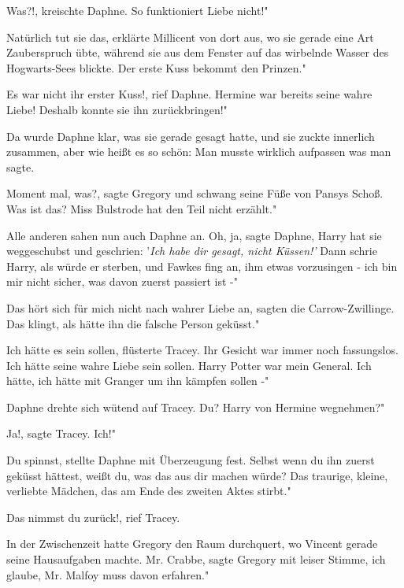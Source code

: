 \glqq{}Was?!\grqq{}, kreischte Daphne. \glqq{}So funktioniert Liebe nicht!"

\glqq{}Natürlich tut sie das\grqq{}, erklärte Millicent von dort aus, wo sie
gerade eine Art Zauberspruch übte, während sie aus dem Fenster auf das wirbelnde
Wasser des Hogwarts-Sees blickte. \glqq{}Der erste Kuss bekommt den Prinzen."

\glqq{}Es war nicht ihr erster Kuss!\grqq{}, rief Daphne. \glqq{}Hermine war
bereits seine wahre Liebe! Deshalb konnte sie ihn zurückbringen!"

Da wurde Daphne klar, was sie gerade gesagt hatte, und sie zuckte innerlich
zusammen, aber wie heißt es so schön: Man musste wirklich aufpassen was man
sagte.

\glqq{}Moment mal, was?\grqq{}, sagte Gregory und schwang seine Füße von Pansys
Schoß. \glqq{}Was ist das? Miss Bulstrode hat den Teil nicht erzählt."

Alle anderen sahen nun auch Daphne an. \glqq{}Oh, ja\grqq{}, sagte Daphne, \glqq{}
Harry hat sie weggeschubst und geschrien: '\emph{Ich habe dir gesagt, nicht
Küssen!'} Dann schrie Harry, als würde er sterben, und Fawkes fing an, ihm etwas
vorzusingen - ich bin mir nicht sicher, was davon zuerst passiert ist -"

\glqq{}Das hört sich für mich nicht nach wahrer Liebe an\grqq{}, sagten die
Carrow-Zwillinge. \glqq{}Das klingt, als hätte ihn die falsche Person geküsst."

\glqq{}Ich hätte es sein sollen\grqq{}, flüsterte Tracey. Ihr Gesicht war immer
noch fassungslos. \glqq{}Ich hätte seine wahre Liebe sein sollen. Harry Potter
war mein General. Ich hätte, ich hätte mit Granger um ihn kämpfen sollen -"

Daphne drehte sich wütend auf Tracey. \glqq{}Du? Harry von Hermine wegnehmen?"

\glqq{}Ja!\grqq{}, sagte Tracey. \glqq{}Ich!"

\glqq{}Du spinnst\grqq{}, stellte Daphne mit Überzeugung fest. \glqq{}Selbst wenn
du ihn zuerst geküsst hättest, weißt du, was das aus dir machen würde? Das
traurige, kleine, verliebte Mädchen, das am Ende des zweiten Aktes stirbt."

\glqq{}Das nimmst du zurück!\grqq{}, rief Tracey.

In der Zwischenzeit hatte Gregory den Raum durchquert, wo Vincent gerade seine
Hausaufgaben machte. \glqq{}Mr. Crabbe\grqq{}, sagte Gregory mit leiser Stimme,
\glqq{}ich glaube, Mr. Malfoy muss davon erfahren."

